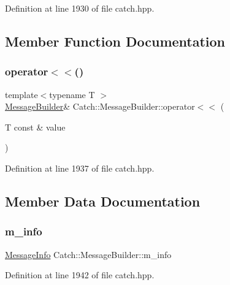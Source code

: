 Definition at line 1930 of file catch.\+hpp.



\subsection{Member Function Documentation}
\hypertarget{struct_catch_1_1_message_builder_a20fa48d069b20dddcc2d3df8abb123c1}{}\label{struct_catch_1_1_message_builder_a20fa48d069b20dddcc2d3df8abb123c1} 
\subsubsection{\texorpdfstring{operator$<$$<$()}{operator<<()}}
{\footnotesize\ttfamily template$<$typename T $>$ \\
\hyperlink{struct_catch_1_1_message_builder}{Message\+Builder}\& Catch\+::\+Message\+Builder\+::operator$<$$<$ (\begin{DoxyParamCaption}\item[{T const \&}]{value }\end{DoxyParamCaption})\hspace{0.3cm}{\ttfamily [inline]}}



Definition at line 1937 of file catch.\+hpp.



\subsection{Member Data Documentation}
\hypertarget{struct_catch_1_1_message_builder_a979f1c2b36d78f80ee275bfa5ba0209f}{}\label{struct_catch_1_1_message_builder_a979f1c2b36d78f80ee275bfa5ba0209f} 
\subsubsection{\texorpdfstring{m\+\_\+info}{m\_info}}
{\footnotesize\ttfamily \hyperlink{struct_catch_1_1_message_info}{Message\+Info} Catch\+::\+Message\+Builder\+::m\+\_\+info}



Definition at line 1942 of file catch.\+hpp.

